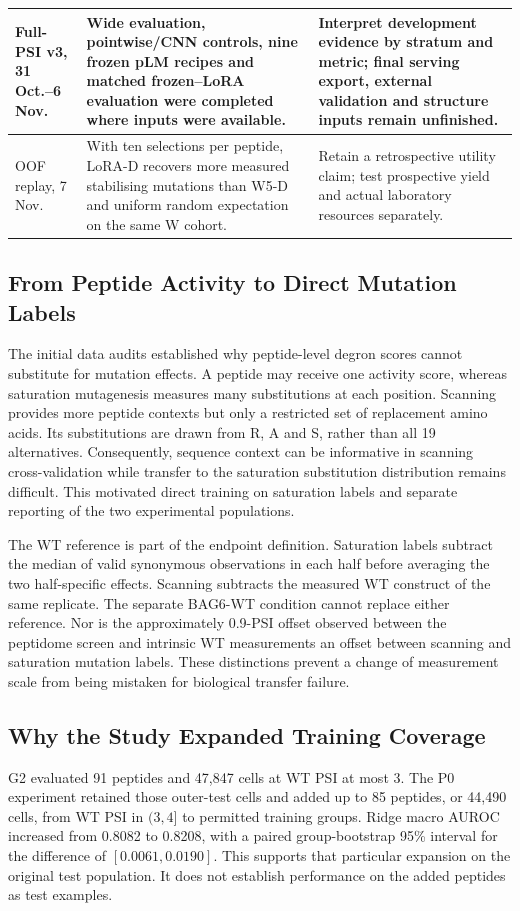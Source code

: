 \begin{longtable}{|P{2.0cm}|P{5.8cm}|P{\dimexpr\textwidth-7.8cm-6\arrayrulewidth\relax}|}
Full-PSI v3, 31 Oct.--6 Nov. & Wide evaluation, pointwise/CNN controls, nine frozen pLM recipes and matched frozen--LoRA evaluation were completed where inputs were available. & Interpret development evidence by stratum and metric; final serving export, external validation and structure inputs remain unfinished. \\ \hline
OOF replay, 7 Nov. & With ten selections per peptide, LoRA-D recovers more measured stabilising mutations than W5-D and uniform random expectation on the same W cohort. & Retain a retrospective utility claim; test prospective yield and actual laboratory resources separately. \\ \hline
\end{longtable}
\endgroup

\subsection{From Peptide Activity to Direct Mutation Labels}
The initial data audits established why peptide-level degron scores cannot substitute for mutation
effects. A peptide may receive one activity score, whereas \mbox{saturation} mutagenesis measures many
substitutions at each position. Scanning provides more peptide contexts but only a restricted set of
replacement amino acids. Its substitutions are drawn from R, A and S, rather than all 19 alternatives.
Consequently, sequence context can be informative in scanning cross-validation while transfer to
the saturation substitution distribution remains difficult. This motivated direct training on
saturation labels and separate reporting of the two experimental populations.

The WT reference is part of the endpoint definition. Saturation labels subtract the median of
valid synonymous observations in each half before averaging the two half-specific effects.
Scanning subtracts the measured WT construct of the same replicate. The separate BAG6-WT
condition cannot replace either reference. Nor is the approximately 0.9-PSI offset observed between
the peptidome screen and intrinsic WT measurements an offset between scanning and saturation
mutation labels. These distinctions prevent a change of measurement scale from being mistaken
for biological transfer failure.

\subsection{Why the Study Expanded Training Coverage}
G2 evaluated 91 peptides and 47,847 cells at WT PSI at most 3. The P0 experiment retained those
outer-test cells and added up to 85 peptides, or 44,490 cells, from WT PSI in $(3,4]$ to permitted
training groups. Ridge macro AUROC increased from 0.8082 to 0.8208, with a paired group-bootstrap
95\% interval for the difference of $[0.0061,0.0190]$. This supports that particular expansion on the
original test population. It does not establish performance on the added peptides as test examples.

